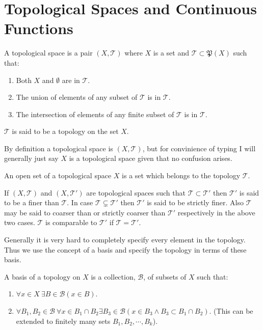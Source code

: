 \section{Topological Spaces and Continuous Functions}
\begin{definition}
  A topological space is a pair $(X, \mathscr{T})$ where $X$ is a set and $ \mathscr{T}\subset \mathfrak{P} (X)$ such that:
  \begin{enumerate}
    \item Both $X$ and $\emptyset$ are in $ \mathscr{T}$.
    \item The union of elements of any subset of $ \mathscr{T}$ is in $ \mathscr{T}$.
    \item The intersection of elements of any finite subset of $ \mathscr{T}$ is in $ \mathscr{T}$.
  \end{enumerate}
  $ \mathscr{T}$ is said to be a topology on the set $X$.
\end{definition}
\begin{remark}
  By definition a topological space is $(X, \mathscr{T})$, but for convinience of typing I will generally just say $X$ is a topological space given that no confusion arises.
\end{remark}
\begin{definition}
  An open set of a topological space $X$ is a set which belongs to the topology $ \mathscr{T}$.
\end{definition}
\begin{definition}
  If $(X, \mathscr{T})$ and $(X, \mathscr{T}')$ are topological spaces such that $ \mathscr{T} \subset \mathscr{T}'$ then $ \mathscr{T}'$ is said to be a finer than $ \mathscr{T}$. In case $ \mathscr{T} \subsetneq \mathscr{T}'$ then $ \mathscr{T}'$ is said to be strictly finer. Also $ \mathscr{T}$ may be said to coarser than or strictly coarser than $ \mathscr{T}'$ respectively in the above two cases. $ \mathscr{T}$ is comparable to $ \mathscr{T'}$ if $ \mathscr{T} = \mathscr{T}'$.
\end{definition}
Generally it is very hard to completely specify every element in the topology. Thus we use the concept of a basis and specify the topology in terms of these basis.
\begin{definition}
  A basis of a topology on $X$ is a collection, $ \mathscr{B}$, of subsets of $X$ such that:
  \begin{enumerate}
    \item $\forall x\in X \ \exists B\in \mathscr{B} (x\in B)$.
    \item $\forall B_1,B_2 \in \mathscr{B}\ \forall x\in B_1\cap B_2\exists B_3 \in \mathscr{B} (x\in B_3 \land  B_3 \subset B_1\cap B_2)$. (This can be extended to finitely many sets $B_1,B_2,\cdots, B_k$).
  \end{enumerate}
\end{definition}
